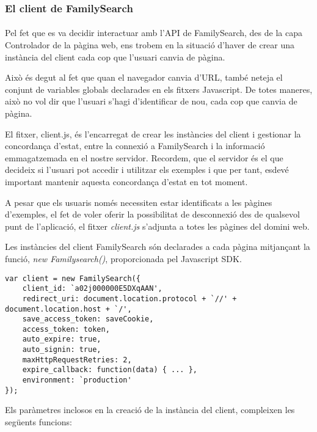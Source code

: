 \subsubsection{El client de FamilySearch}

\paragraph{}
Pel fet que es va decidir interactuar amb l'API de FamilySearch, des de la capa Controlador de la pàgina web, ens trobem en la situació d'haver de crear una instància del client cada cop que l'usuari canvia de pàgina.

Això és degut al fet que quan el navegador canvia d'URL, també neteja el conjunt de variables globals declarades en els fitxers Javascript. De totes maneres, això no vol dir que l'usuari s'hagi d'identificar de nou, cada cop que canvia de pàgina.

El fitxer, client.js, és l'encarregat de crear les instàncies del client i gestionar la concordança d'estat, entre la connexió a FamilySearch i la informació emmagatzemada en el nostre servidor. Recordem, que el servidor és el que decideix si l'usuari pot accedir i utilitzar els exemples i que per tant, esdevé important mantenir aquesta concordança d'estat en tot moment.

A pesar que els usuaris només necessiten estar identificats a les pàgines d'exemples, el fet de voler oferir la possibilitat de desconnexió des de qualsevol punt de l'aplicació, el fitxer \emph{client.js} s'adjunta a totes les pàgines del domini web.

Les instàncies del client FamilySearch són declarades a cada pàgina mitjançant la funció, \emph{new Familysearch()}, proporcionada pel Javascript SDK.

\begin{lstlisting}[style=rawOwn,caption={Creació d'una instància del client FamilySearch}]
var client = new FamilySearch({
    client_id: `a02j000000E5DXqAAN',
    redirect_uri: document.location.protocol + `//' + document.location.host + `/',
    save_access_token: saveCookie,
    access_token: token,
    auto_expire: true,
    auto_signin: true,
    maxHttpRequestRetries: 2,
    expire_callback: function(data) { ... },
    environment: `production'
});
\end{lstlisting}

Els paràmetres inclosos en la creació de la instància del client, compleixen les següents funcions:

